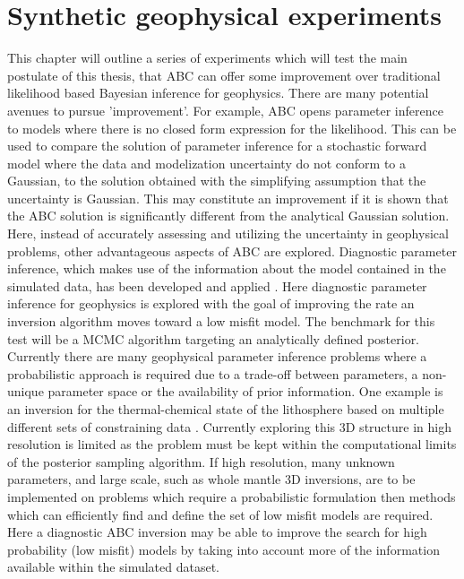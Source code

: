 \chapter{Synthetic geophysical experiments}
\label{SGE}
This chapter will outline a series of experiments which will test the main postulate of this thesis, that ABC can offer some improvement over traditional likelihood based Bayesian inference for geophysics. There are many potential avenues to pursue 'improvement'. For example, ABC opens parameter inference to models where there is no closed form expression for the likelihood. This can be used to compare the solution of parameter inference for a stochastic forward model where the data and modelization uncertainty do not conform to a Gaussian, to the solution obtained with the simplifying assumption that the uncertainty is Gaussian. This may constitute an improvement if it is shown that the ABC solution is significantly different from the analytical Gaussian solution. Here, instead of accurately assessing and utilizing the uncertainty in geophysical problems, other advantageous aspects of ABC are explored. Diagnostic parameter inference, which makes use of the information about the model contained in the simulated data, has been developed and applied \citep{Ratmann2009,vrugt2013toward}. Here diagnostic parameter inference for geophysics is explored with the goal of improving the rate an inversion algorithm moves toward a low misfit model. The benchmark for this test will be a MCMC algorithm targeting an analytically defined posterior. Currently there are many geophysical parameter inference problems where a probabilistic approach is required due to a trade-off between parameters, a non-unique parameter space or the availability of prior information. One example is an inversion for the thermal-chemical state of the lithosphere based on multiple different sets of constraining data \citep{afonso2013a,afonso2013b}. Currently exploring this 3D structure in high resolution is limited as the problem must be kept within the computational limits of the posterior sampling algorithm. If high resolution, many unknown parameters, and large scale, such as whole mantle 3D inversions, are to be implemented on problems which require a probabilistic formulation then methods which can efficiently find and define the set of low misfit models are required. Here a diagnostic ABC inversion may be able to improve the search for high probability (low misfit) models by taking into account more of the information available within the simulated dataset. \par

